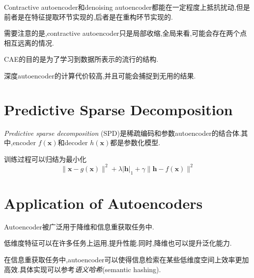 Contractive autoencoder和denoising autoencoder都能在一定程度上抵抗扰动,但是前者是在特征提取环节实现的,后者是在重构环节实现的.

需要注意的是,contractive autoencoder只是局部收缩,全局来看,可能会存在两个点相互远离的情况.

CAE的目的是为了学习到数据所表示的流行的结构.

深度autoencoder的计算代价较高,并且可能会捕捉到无用的结果.

\section{Predictive Sparse Decomposition}

\textit{Predictive sparse decomposition} (SPD)是稀疏编码和参数autoencoder的结合体.其中,encoder $f(\mathbf x)$和decoder $h(\mathbf x)$都是参数化模型.

训练过程可以归结为最小化
\begin{equation}
\|\mathbf x-g(\mathbf x)\|^2+\lambda|\mathbf h|_1+\gamma\|\mathbf h-f(\mathbf x)\|^2
\end{equation}

\section{Application of Autoencoders}

Autoencoder被广泛用于降维和信息重获取任务中.

低维度特征可以在许多任务上运用,提升性能.同时,降维也可以提升泛化能力.

在信息重获取任务中,autoencoder可以使得信息检索在某些低维度空间上效率更加高效.具体实现可以参考\textit{语义哈希}(semantic hashing).